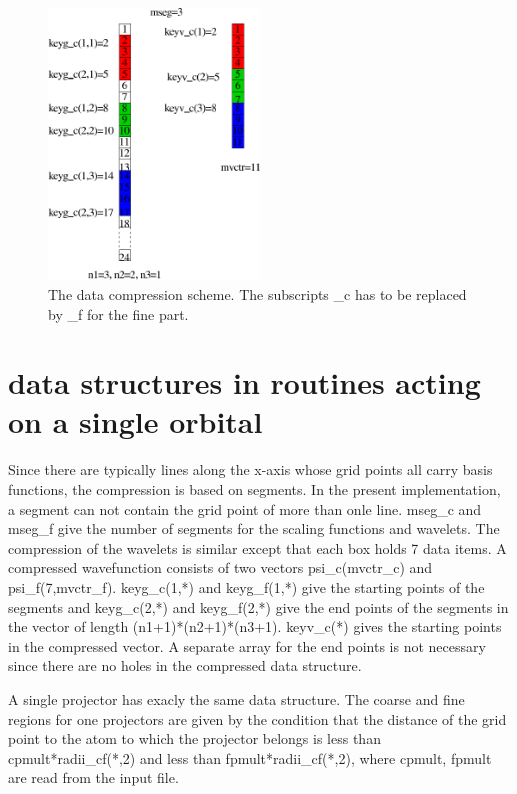 \documentclass[12pt]{article}
\begin{document}
\begin{figure}[h]             %
\begin{center}
\setlength{\unitlength}{1cm}
\includegraphics[width=0.5\textwidth]{compress.pdf}
\caption{ \label{compress} The data compression scheme. The subscripts \_c has to be replaced 
by \_f for the fine part.}
\end{center}
\end{figure}

\section{data structures in routines acting on a single orbital}
Since there are typically lines along the x-axis whose grid points all carry basis functions, 
the compression is based on segments. In the present implementation, a segment can not 
contain the grid point of more than onle line. {\color{red} mseg\_c} and 
{\color{red} mseg\_f} give the 
number of segments for the scaling functions and wavelets. The compression of the 
wavelets is similar except that each box holds 7 data items. A compressed wavefunction consists 
of two vectors {\color{red} psi\_c(mvctr\_c)} and {\color{red} psi\_f(7,mvctr\_f)}. 
{\color{red} keyg\_c(1,*)} and {\color{red} keyg\_f(1,*)}  give the starting points of the segments and
{\color{red} keyg\_c(2,*)} and {\color{red} keyg\_f(2,*)} give the end points of the segments in 
the vector of length (n1+1)*(n2+1)*(n3+1). {\color{red} keyv\_c(*)} gives the 
starting points in the compressed vector. A separate array for the end points is not 
necessary since there are no holes in the compressed data structure. 

A single projector has exacly the same data structure. The coarse and fine regions for 
one projectors are given by the condition that the distance of the grid point to 
the atom to which the projector belongs is less than  cpmult*radii\_cf(*,2) and less 
than fpmult*radii\_cf(*,2), where {\color{red} cpmult, fpmult} are read from the input file.
\end{document}
